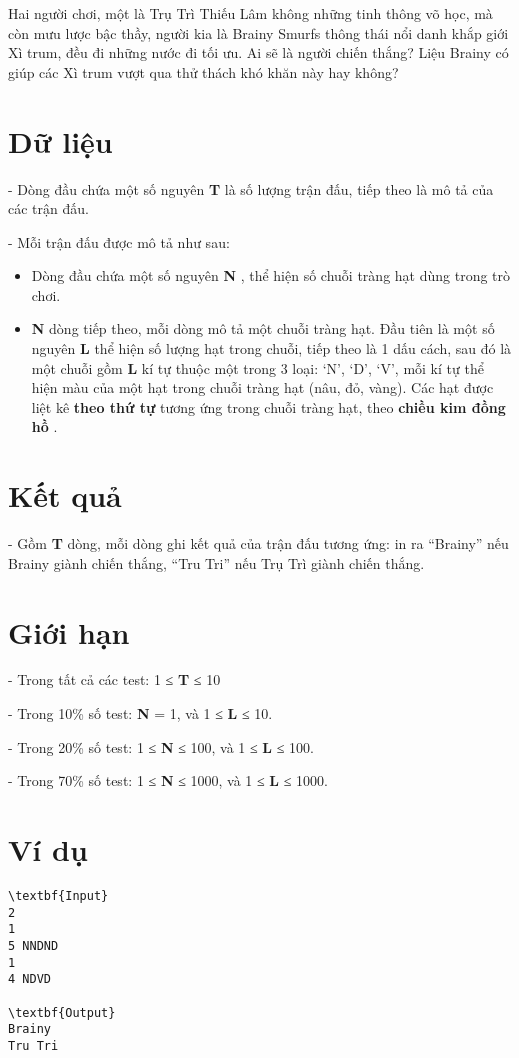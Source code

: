 Hai người chơi, một là Trụ Trì Thiếu Lâm không những tinh thông võ học, mà còn mưu lược bậc thầy, người kia là Brainy Smurfs thông thái nổi danh khắp giới Xì trum, đều đi những nước đi tối ưu. Ai sẽ là người chiến thắng? Liệu Brainy có giúp các Xì trum vượt qua thử thách khó khăn này hay không?

\section{Dữ liệu}

- Dòng đầu chứa một số nguyên \textbf{ T } là số lượng trận đấu, tiếp theo là mô tả của các trận đấu.

- Mỗi trận đấu được mô tả như sau:
\begin{itemize}
	\item Dòng đầu chứa một số nguyên \textbf{ N } , thể hiện số chuỗi tràng hạt dùng trong trò chơi.
	\item \textbf{N } dòng tiếp theo, mỗi dòng mô tả một chuỗi tràng hạt. Đầu tiên là một số nguyên \textbf{ L } thể hiện số lượng hạt trong chuỗi, tiếp theo là 1 dấu cách, sau đó là một chuỗi gồm \textbf{ L } kí tự thuộc một trong 3 loại: ‘N’, ‘D’, ‘V’, mỗi kí tự thể hiện màu của một hạt trong chuỗi tràng hạt (nâu, đỏ, vàng). Các hạt được liệt kê \textbf{ theo thứ tự } tương ứng trong chuỗi tràng hạt, theo \textbf{ chiều kim đồng hồ } .
\end{itemize}

\section{Kết quả}

- Gồm \textbf{ T } dòng, mỗi dòng ghi kết quả của trận đấu tương ứng: in ra “Brainy” nếu Brainy giành chiến thắng, “Tru Tri” nếu Trụ Trì giành chiến thắng.

\section{Giới hạn}

- Trong tất cả các test: 1 ≤ \textbf{ T } ≤ 10

- Trong 10\% số test: \textbf{ N } = 1, và 1 ≤ \textbf{ L } ≤ 10.

- Trong 20\% số test: 1 ≤ \textbf{ N } ≤ 100, và 1 ≤ \textbf{ L } ≤ 100.

- Trong 70\% số test: 1 ≤ \textbf{ N } ≤ 1000, và 1 ≤ \textbf{ L } ≤ 1000.

\section{Ví dụ}
\begin{verbatim}
\textbf{Input}
2
1
5 NNDND
1
4 NDVD

\textbf{Output}
Brainy
Tru Tri
\end{verbatim}

